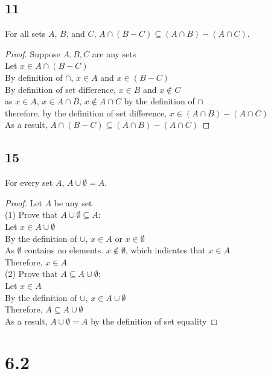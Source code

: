 \documentclass{article}
\begin{document}
\subsection{11}
For all sets $A$, $B$, and $C$, $A \cap (B - C) \subseteq (A \cap B) - (A \cap C)$.
\begin{proof}
    Suppose $A,B,C$ are any sets\\
    Let $x \in A \cap (B-C)$\\
    By definition of $\cap$, $x \in A$ and $x \in (B-C)$\\
    By definition of set difference, $x \in B$ and $x \notin C$\\
    as $x \in A$, $x \in A \cap B$, $x \notin A \cap C$ by the definition of $\cap$\\
    therefore, by the definition of set difference, $x \in (A\cap B) - (A \cap C)$\\
    As a result, $A \cap (B - C) \subseteq (A \cap B) - (A \cap C)$
\end{proof}

\subsection{15}
For every set $A$, $A \cup \emptyset = A$.
\begin{proof}
    Let $A$ be any set\\
    (1) Prove that $A \cup \emptyset \subseteq A$:\\
    Let $x\in A\cup \emptyset$\\
    By the definition of $\cup$, $x \in A$ or $x \in \emptyset$\\
    As $\emptyset$ contains no elements. $x \notin \emptyset$, which indicates that $x \in A$\\
    Therefore, $x \in A$\\
    (2) Prove that $A \subseteq A \cup \emptyset $:\\
    Let $x \in A$\\
    By the definition of $\cup$, $x \in A \cup \emptyset$\\
    Therefore, $A \subseteq A \cup \emptyset$ \\
    As a result, $A \cup \emptyset = A$ by the definition of set equality
\end{proof}

\section{6.2}
\end{document}
